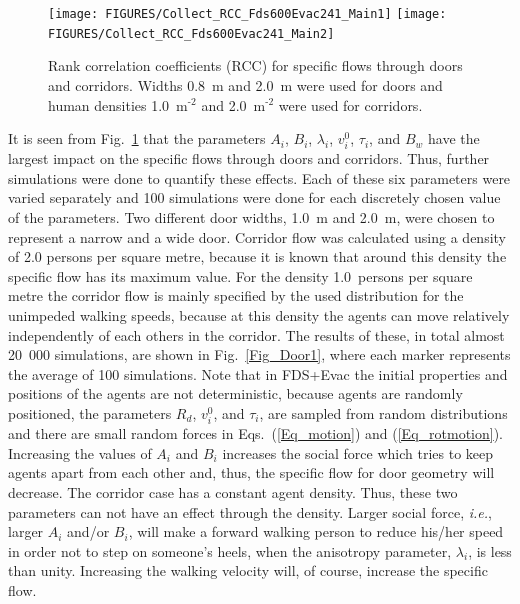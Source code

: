 \documentclass[12pt,a4paper,final,twoside]{stylevk}
\begin{document}
%
\begin{figure}[!tb]
  \centerline{\texttt{[image: FIGURES/Collect\_RCC\_Fds600Evac241\_Main1]}  
      \texttt{[image: FIGURES/Collect\_RCC\_Fds600Evac241\_Main2]} } 
  \caption{Rank correlation coefficients (RCC) for specific flows
    through doors and corridors.  Widths 0.8~m and 2.0~m were used for
    doors and human densities 1.0~$\mathrm{ \textrm{m}^\textrm{-2} } $
    and 2.0~$\mathrm{ \textrm{m}^\textrm{-2} } $ were used for
    corridors.\protect\hspace{200mm}}\label{Fig_RCC}
\end{figure}
%


It is seen from Fig.~\ref{Fig_RCC} that the parameters $A_i$, $B_i$,
$\lambda_i$, $v^0_i$, $\tau_i$, and $B_w$ have the largest impact on
the specific flows through doors and corridors. Thus, further
simulations were done to quantify these effects. Each of these six
parameters were varied separately and 100 simulations were done for
each discretely chosen value of the parameters.  Two different door
widths, 1.0~m and 2.0~m, were chosen to represent a narrow and a wide
door.  Corridor flow was calculated using a density of 2.0 persons per
square metre, because it is known that around this density the
specific flow has its maximum value.  For the density 1.0~persons per
square metre the corridor flow is mainly specified by the used
distribution for the unimpeded walking speeds, because at this density
the agents can move relatively independently of each others in the
corridor.  The results of these, in total almost 20~000 simulations,
are shown in Fig.~\ref{Fig_Door1}, where each marker represents the
average of 100 simulations.  Note that in FDS+Evac the initial
properties and positions of the agents are not deterministic, because
agents are randomly positioned, the parameters $R_d$, $v^0_i$, and
$\tau_i$, are sampled from random distributions and there are small
random forces in Eqs.~(\ref{Eq_motion}) and (\ref{Eq_rotmotion}).
Increasing the values of $A_i$ and $B_i$ increases the social force
which tries to keep agents apart from each other and, thus, the
specific flow for door geometry will decrease.  The corridor case has
a constant agent density.  Thus, these two parameters can not have an
effect through the density.  Larger social force, \emph{i.e.}, larger
$A_i$ and/or $B_i$, will make a forward walking person to reduce
his/her speed in order not to step on someone's heels, when the
anisotropy parameter, $\lambda_i$, is less than unity.  Increasing the
walking velocity will, of course, increase the specific flow.
\end{document}
